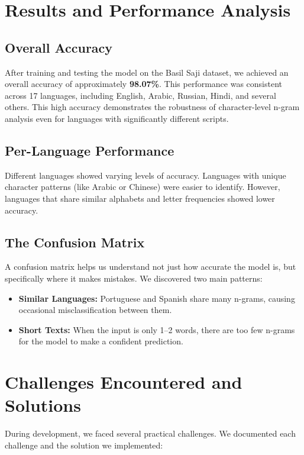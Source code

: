 \documentclass[conference]{IEEEtran}
\begin{document}
\section{Results and Performance Analysis}

\subsection{Overall Accuracy}

After training and testing the model on the Basil Saji dataset, we achieved an overall accuracy of approximately \textbf{98.07\%}. This performance was consistent across 17 languages, including English, Arabic, Russian, Hindi, and several others. This high accuracy demonstrates the robustness of character-level n-gram analysis even for languages with significantly different scripts.

\subsection{Per-Language Performance}

Different languages showed varying levels of accuracy. Languages with unique character patterns (like Arabic or Chinese) were easier to identify. However, languages that share similar alphabets and letter frequencies showed lower accuracy.

\subsection{The Confusion Matrix}

A confusion matrix helps us understand not just how accurate the model is, but specifically where it makes mistakes. We discovered two main patterns:

\begin{itemize}
    \item \textbf{Similar Languages:} Portuguese and Spanish share many n-grams, causing occasional misclassification between them.
    \item \textbf{Short Texts:} When the input is only 1–2 words, there are too few n-grams for the model to make a confident prediction.
\end{itemize}

\section{Challenges Encountered and Solutions}

During development, we faced several practical challenges. We documented each challenge and the solution we implemented:
\renewcommand{\arraystretch}{1.4}
\end{document}
